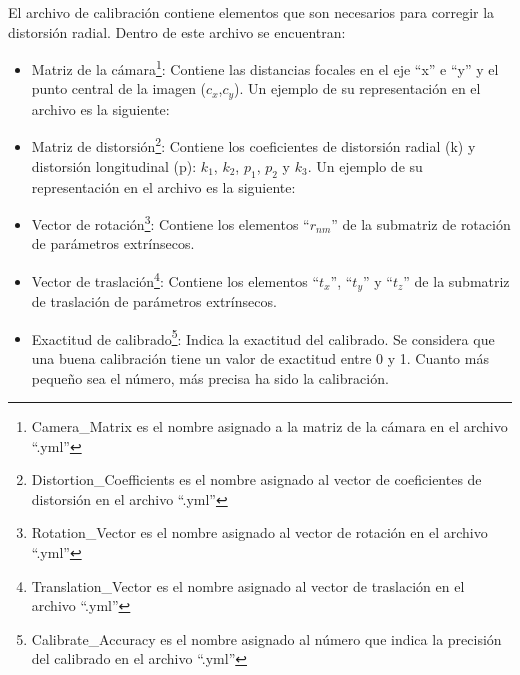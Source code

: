 El archivo de calibración contiene elementos que son necesarios para corregir la distorsión radial. Dentro de este archivo se encuentran:
\begin{itemize}
    \item Matriz de la cámara\footnote{Camera\_Matrix es el nombre asignado a la matriz de la cámara en el archivo ``.yml''}: Contiene las distancias focales en el eje ``x'' e ``y'' y el punto central de la imagen ($c_x$,$c_y$). Un ejemplo de su representación en el archivo es la siguiente:
    
    
    \item Matriz de distorsión\footnote{Distortion\_Coefficients es el nombre asignado al vector de coeficientes de distorsión en el archivo ``.yml''}: Contiene los coeficientes de distorsión radial (k) y distorsión longitudinal (p): $k_1$, $k_2$, $p_1$, $p_2$ y $k_3$.  Un ejemplo de su representación en el archivo es la siguiente:
    


    \item Vector de rotación\footnote{Rotation\_Vector es el nombre asignado al vector de rotación en el archivo ``.yml''}: Contiene los elementos ``$r_{nm}$'' de la submatriz de rotación de parámetros extrínsecos.
    \item Vector de traslación\footnote{Translation\_Vector es el nombre asignado al vector de traslación en el archivo ``.yml''}: Contiene los elementos ``$t_{x}$'', ``$t_{y}$'' y ``$t_{z}$'' de la submatriz de traslación de parámetros extrínsecos.
    \item Exactitud de calibrado\footnote{Calibrate\_Accuracy es el nombre asignado al número que indica la precisión del calibrado en el archivo ``.yml''}: Indica la exactitud del calibrado. Se considera que una buena calibración tiene un valor de exactitud entre 0 y 1. Cuanto más pequeño sea el número, más precisa ha sido la calibración.
    

\end{itemize}
